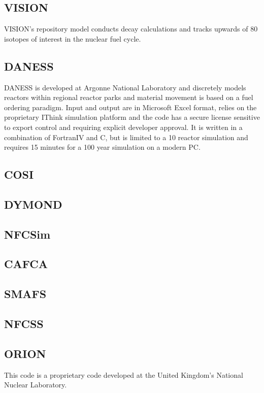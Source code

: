 \subsection{VISION} VISION's repository model conducts decay calculations and
tracks upwards of 80 isotopes of interest in the nuclear fuel cycle.
\cite{yacout_visionverifiable_2006} 

\subsection{DANESS} DANESS is developed at Argonne National Laboratory and
discretely models reactors within regional reactor parks and material movement
is based on a fuel ordering paradigm. Input and output are in Microsoft Excel
format, relies on the proprietary IThink simulation platform and the code has a
secure license sensitive to export control and requiring explicit developer
approval. It is written in a combination of FortranIV and C, but is limited to
a 10 reactor simulation and requires 15 minutes for a 100 year simulation on a
modern PC.\cite{wlodarski_daness_2011,van_den_durpel_daness:_2006} 

\subsection{COSI}

\subsection{DYMOND}

\subsection{NFCSim}

\subsection{CAFCA}

\subsection{SMAFS}

\subsection{NFCSS}

\subsection{ORION} This code is a proprietary code developed at the United
Kingdom's National Nuclear Laboratory.

